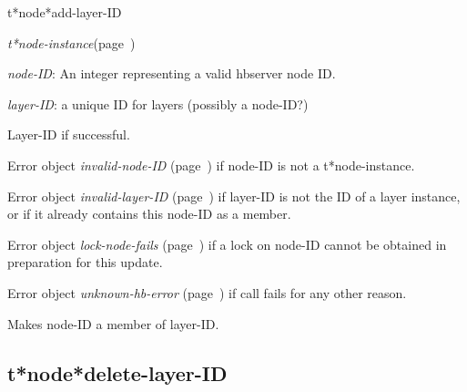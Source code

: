 \begin{description}
\item [Name:]  t*node*add-layer-ID

\item [Class:] {\sl t*node-instance}\hfill(page~\pageref{t*node-instance})

\item [Parameters:]
\item {\sl node-ID}:   An integer representing
a valid hbserver node ID.

\item {\sl layer-ID}:  a unique ID for layers (possibly a node-ID?)



\item [Return-value:]
Layer-ID if successful.

Error object {\sl invalid-node-ID} (page~\pageref{invalid-node-ID}) if node-ID is not
a t*node-instance.

Error object {\sl invalid-layer-ID} (page~\pageref{invalid-layer-ID}) if layer-ID is
not the ID of a layer instance, or if it already
contains this node-ID as a member.

Error object {\sl lock-node-fails} (page~\pageref{lock-node-fails}) if a lock on
node-ID cannot be obtained in preparation for this
update.

Error object {\sl unknown-hb-error} (page~\pageref{unknown-hb-error}) if call fails
for any other reason.

\item [Description:]

Makes node-ID a member of layer-ID.

\item [Public:]



\end{description}
\horizontalline

\subsection{t*node*delete-layer-ID}
\label{t*node*delete-layer-ID}

